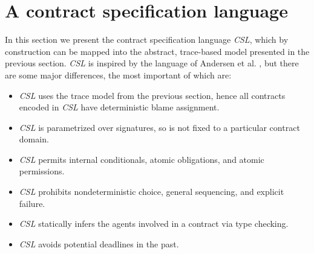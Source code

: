 \documentclass[orivec,final]{llncs-href}
\newcommand{\csl}{\textit{CSL}}
\begin{document}
\section{A contract specification language}\label{sec:csl}
In this section we present the contract specification language \csl{},
which by construction can be mapped into the abstract, trace-based
model presented in the previous section. \csl{} is inspired by the
language of Andersen et al. \cite{andersen06contracts}, but there are
some major differences, the most important of which are:
\begin{itemize}
\item \csl{} uses the trace model from the previous section, hence all
  contracts encoded in \csl{} have deterministic blame assignment.
\item \csl{} is parametrized over signatures, so is not fixed to a
  particular contract domain.
\item \csl{} permits internal conditionals, atomic obligations, and
  atomic permissions.
\item \csl{} prohibits nondeterministic choice, general sequencing, and
  explicit failure.
\item \csl{} statically infers the agents involved in a contract via
  type checking.
\item \csl{} avoids potential deadlines in the past.
\end{itemize}
\end{document}
